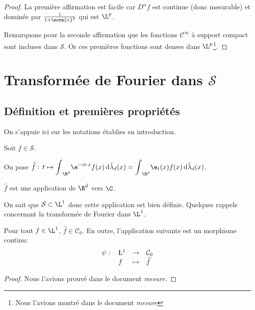 \begin{proof}
La première affirmation est facile car $D^{\alpha} f$ est continue (donc mesurable) et dominée par $\frac{1}{1+\norm{x}^2}$ qui est $\L^p$.

\medskip
Remarquons pour la seconde affirmation que les fonctions $\mathcal{C}^{\infty}$ à support compact sont incluses dans $\mathcal{S}$. Or ces premières fonctions sont denses dans $\L^p$\footnote{Nous l'avions montré dans le document \emph{mesure}}.
\end{proof}

\section{Transformée de Fourier dans $\mathbf{\mathcal{S}}$}

\subsection{Définition et premières propriétés}

On s'appuie ici sur les notations établies en introduction.

\begin{de}
Soit $f \in \mathcal{S}$. 

\medskip
On pose $\widehat{f}: \, t \mapsto \displaystyle{\int}_{\R^d} \e^{-i t \cdot x} f(x) \, \mathrm d \tilde{\lambda}_d(x) = \displaystyle{\int}_{\R^d} \e_t(x) f(x) \, \mathrm d \tilde{\lambda}_d(x)$. 

\medskip
$\widehat{f}$ est une application de $\R^d$ vers $\C$.
\end{de}

On sait que $\mathcal{S} \subset \L^1$ donc cette application est bien définie. Quelques rappels concernant la transformée de Fourier dans $\L^1$.

\begin{prop}
Pour tout $f \in \L^1$, $\widehat{f} \in \mathcal{C}_0$. En outre, l'application suivante est un morphisme continu:
\[
\begin{array}{llcl}
\psi: \, & \L^1 & \to & \mathcal{C}_0 \\
 & f & \mapsto & \widehat{f}
\end{array}
\]
\end{prop}

\begin{proof}
Nous l'avions prouvé dans le document \emph{mesure.}
\end{proof}

